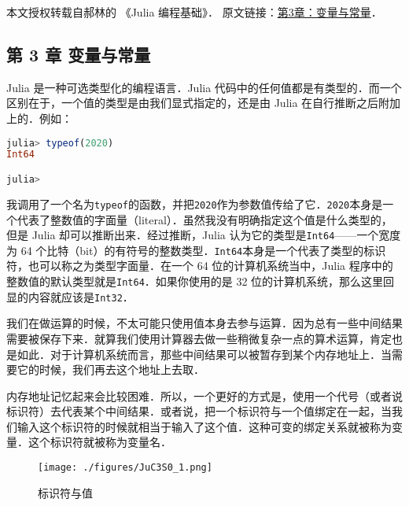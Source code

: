 
本文授权转载自郝林的 《Julia 编程基础》． 原文链接：\href{https://github.com/hyper0x/JuliaBasics/blob/master/book/ch03.md}{第3章：变量与常量}．


\subsection{第 3 章 变量与常量}

Julia 是一种可选类型化的编程语言．Julia 代码中的任何值都是有类型的．而一个区别在于，一个值的类型是由我们显式指定的，还是由 Julia 在自行推断之后附加上的．例如：

\begin{lstlisting}[language=julia]
julia> typeof(2020)
Int64

julia> 
\end{lstlisting}

我调用了一个名为\verb|typeof|的函数，并把\verb|2020|作为参数值传给了它．\verb|2020|本身是一个代表了整数值的字面量（literal）．虽然我没有明确指定这个值是什么类型的，但是 Julia 却可以推断出来．经过推断，Julia 认为它的类型是\verb|Int64|——一个宽度为 64 个比特（bit）的有符号的整数类型．\verb|Int64|本身是一个代表了类型的标识符，也可以称之为类型字面量．在一个 64 位的计算机系统当中，Julia 程序中的整数值的默认类型就是\verb|Int64|．如果你使用的是 32 位的计算机系统，那么这里回显的内容就应该是\verb|Int32|．

我们在做运算的时候，不太可能只使用值本身去参与运算．因为总有一些中间结果需要被保存下来．就算我们使用计算器去做一些稍微复杂一点的算术运算，肯定也是如此．对于计算机系统而言，那些中间结果可以被暂存到某个内存地址上．当需要它的时候，我们再去这个地址上去取．

内存地址记忆起来会比较困难．所以，一个更好的方式是，使用一个代号（或者说标识符）去代表某个中间结果．或者说，把一个标识符与一个值绑定在一起，当我们输入这个标识符的时候就相当于输入了这个值．这种可变的绑定关系就被称为变量．这个标识符就被称为变量名．

\begin{figure}[ht]
\centering
\texttt{[image: ./figures/JuC3S0\_1.png]}
\caption{标识符与值} \label{JuC3S0_fig1}
\end{figure}